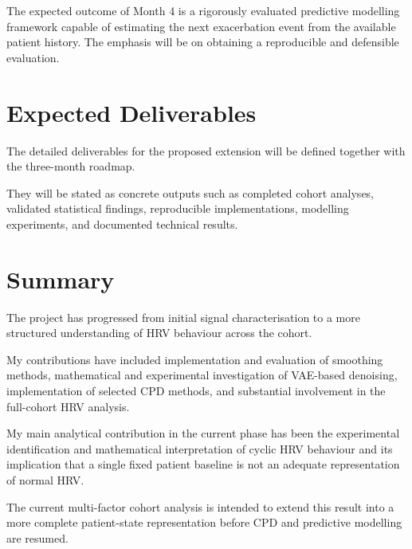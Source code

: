 \documentclass[11pt,a4paper]{article}
\begin{document}
The expected outcome of Month 4 is a rigorously evaluated predictive modelling framework capable of estimating the next exacerbation event from the available patient history. The emphasis will be on obtaining a reproducible and defensible evaluation. 
\section{Expected Deliverables}

The detailed deliverables for the proposed extension will be defined together
with the three-month roadmap.

They will be stated as concrete outputs such as completed cohort analyses,
validated statistical findings, reproducible implementations, modelling
experiments, and documented technical results.

\section{Summary}

The project has progressed from initial signal characterisation to a more
structured understanding of HRV behaviour across the cohort.

My contributions have included implementation and evaluation of smoothing
methods, mathematical and experimental investigation of VAE-based denoising,
implementation of selected CPD methods, and substantial involvement in the
full-cohort HRV analysis.

My main analytical contribution in the current phase has been the experimental
identification and mathematical interpretation of cyclic HRV behaviour and its
implication that a single fixed patient baseline is not an adequate
representation of normal HRV.

The current multi-factor cohort analysis is intended to extend this result into
a more complete patient-state representation before CPD and predictive
modelling are resumed.
\end{document}
